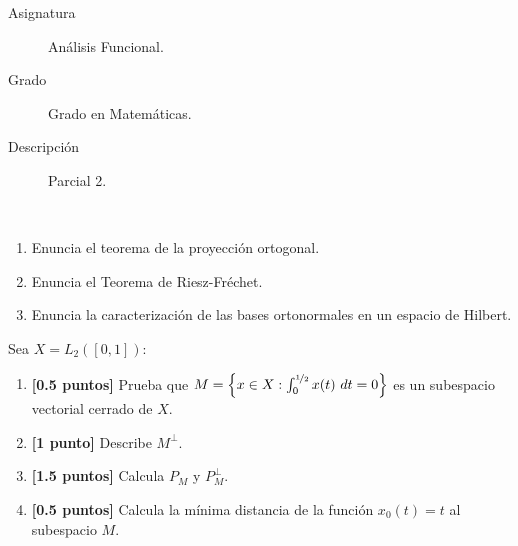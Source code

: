 \documentclass[12pt]{article}
\begin{document}

    
    

    \begin{description}
        \item[Asignatura] Análisis Funcional.
        \item[Grado] Grado en Matemáticas.
        \item[Descripción] Parcial 2.
    
    \end{description}
    \newpage


    
    \begin{ejercicio}[3 puntos]~
        \begin{enumerate}[label=\alph*)]
            \item Enuncia el teorema de la proyección ortogonal.
            \item Enuncia el Teorema de Riesz-Fréchet.
            \item Enuncia la caracterización de las bases ortonormales en un espacio de Hilbert.
        \end{enumerate}
    \end{ejercicio}

    \begin{ejercicio}[3.5 puntos]
        Sea $X=L_2([0,1])$:
        \begin{enumerate}[label=\alph*)]
            \item \textbf{[0.5 puntos]} Prueba que $M = \left\{x\in X : \int_{0}^{\nicefrac{1}{2}} x(t)~dt = 0 \right\}$ es un subespacio vectorial cerrado de $X$.
            \item \textbf{[1 punto]} Describe $M^\perp$.
            \item \textbf{[1.5 puntos]} Calcula $P_M$ y $P_M^\perp$.
            \item \textbf{[0.5 puntos]} Calcula la mínima distancia de la función $x_0(t) = t$ al subespacio $M$.
        \end{enumerate}
    \end{ejercicio}
\end{document}
